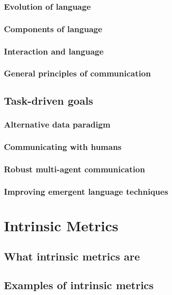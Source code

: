 \documentclass[letterpaper]{report}
\begin{document}
\subsection{Evolution of language}
\subsection{Components of language}
\subsection{Interaction and language}
\subsection{General principles of communication}
\section{Task-driven goals}
\subsection{Alternative data paradigm}
\subsection{Communicating with humans}
\subsection{Robust multi-agent communication}
\subsection{Improving emergent language techniques}


\chapter{Intrinsic Metrics}
\section{What intrinsic metrics are}
\section{Examples of intrinsic metrics}
\end{document}
